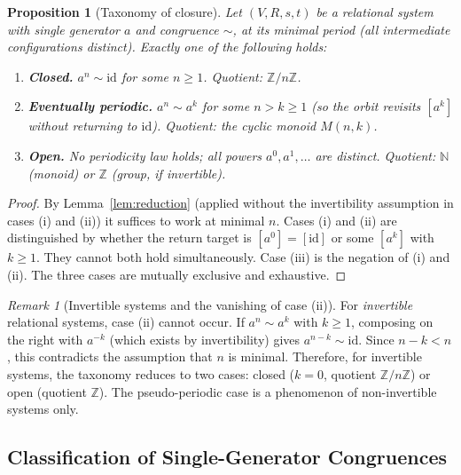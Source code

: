 \documentclass{article}
\newtheorem{proposition}[theorem]{Proposition}
\theoremstyle{definition}
\theoremstyle{remark}
\newtheorem{remark}[theorem]{Remark}
\newcommand{\id}{\mathrm{id}}
\begin{document}
\begin{proposition}[Taxonomy of closure]
\label{prop:taxonomy}
Let $(V, R, s, t)$ be a relational system with single
generator $a$ and congruence $\sim$, at its minimal period
(all intermediate configurations distinct). Exactly one of the
following holds:
\begin{enumerate}[label=(\roman*)]
  \item \textbf{Closed.} $a^n \sim \id$ for some $n \geq 1$.
        Quotient: $\mathbb{Z}/n\mathbb{Z}$.
  \item \textbf{Eventually periodic.} $a^n \sim a^k$ for some
        $n > k \geq 1$ (so the orbit revisits $[a^k]$ without
        returning to $\id$). Quotient: the cyclic monoid $M(n,k)$.
  \item \textbf{Open.} No periodicity law holds; all powers
        $a^0, a^1, \dots$ are distinct. Quotient: $\mathbb{N}$
        (monoid) or $\mathbb{Z}$ (group, if invertible).
\end{enumerate}
\end{proposition}

\begin{proof}
By Lemma~\ref{lem:reduction} (applied without the invertibility
assumption in cases (i) and (ii)) it suffices to work at minimal
$n$. Cases (i) and (ii) are distinguished by whether the return
target is $[a^0] = [\id]$ or some $[a^k]$ with $k \geq 1$.
They cannot both hold simultaneously. Case (iii) is the negation
of (i) and (ii). The three cases are mutually exclusive and
exhaustive.
\end{proof}

\begin{remark}[Invertible systems and the vanishing of case (ii)]
\label{rem:nopp}
For \emph{invertible} relational systems, case (ii) cannot occur.
If $a^n \sim a^k$ with $k \geq 1$, composing on the right with
$a^{-k}$ (which exists by invertibility) gives $a^{n-k} \sim \id$.
Since $n - k < n$, this contradicts the assumption that $n$ is
minimal. Therefore, for invertible systems, the taxonomy reduces
to two cases: closed ($k = 0$, quotient $\mathbb{Z}/n\mathbb{Z}$)
or open (quotient $\mathbb{Z}$). The pseudo-periodic case is a
phenomenon of non-invertible systems only.
\end{remark}

\subsection{Classification of Single-Generator Congruences}
\label{sec:congruence_classification}
\end{document}
